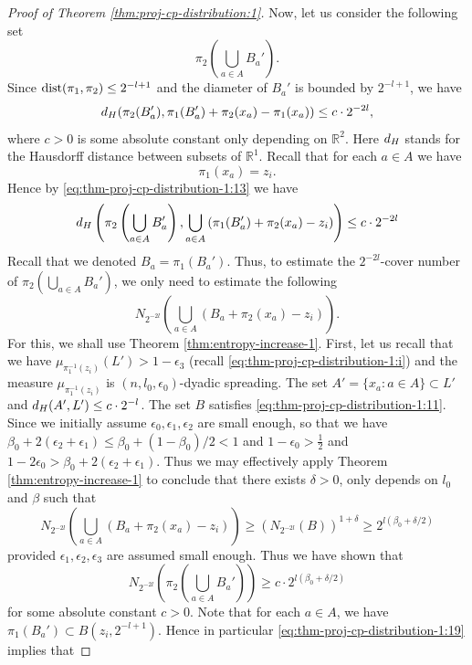 \documentclass[10pt,a4paper]{amsart}
\DeclareMathOperator{\dist}{{\rm dist}}
\def\R{\mathbb R}
\begin{document}
\begin{proof}[Proof of Theorem \ref{thm:proj-cp-distribution:1}]
Now, let us consider the following set 
\[
\pi_2\left( \bigcup_{a\in A}B_a' \right).
\]
Since $\dist(\pi_1,\pi_2)\le 2^{-l+1}$ and the diameter of $B_a'$ is bounded by $2^{-l+1}$,  we have
\begin{equation}\label{eq:thm-proj-cp-distribution-1:13}
d_{\rm H}(\pi_2(B_a'),  \pi_1(B_a')+ \pi_2(x_a) -\pi_1(x_a)) \le  c\cdot 2^{-2l},
\end{equation}
where $c>0$ is some absolute constant only depending on $\R^2$.  Here $d_{\rm H}$ stands for the Hausdorff distance between subsets of $\R^1$. 
Recall that for each $a\in A$ we have
\begin{equation}\label{eq:thm-proj-cp-distribution-1:14}
\pi_1(x_a)=z_i.
\end{equation}
Hence by \eqref{eq:thm-proj-cp-distribution-1:13} we have
{\color{black}
\[
d_{\rm H}\left(\pi_2\left(\bigcup_{a\in A}B_a'\right),  \bigcup_{a\in A}\left(\pi_1(B_a')+ \pi_2(x_a) -z_i\right)\right)\le  c\cdot 2^{-2l}
\]}
Recall that we denoted $B_a=\pi_1(B_a')$.  Thus, to estimate the $2^{-2l}$-cover number of $\pi_2\left( \bigcup_{a\in A}B_a' \right)$, we only need to estimate the following
\[
N_{2^{-2l}}\left( \bigcup_{a\in A}(B_a+ \pi_2(x_a) -z_i) \right).
\]
For this, we shall use Theorem \ref{thm:entropy-increase-1}.   
First,  let us recall that we have $\mu_{\pi_1^{-1}(z_i)} (L')>1-\epsilon_3$ (recall  \eqref{eq:thm-proj-cp-distribution-1:i}) and the 
measure $\mu_{\pi_1^{-1}(z_i)}$ is $(n,l_0,\epsilon_0)$-dyadic spreading.
The set $A'=\{x_a:a\in A\}\subset L'$ and $d_{\rm H}(A',L')\le c\cdot 2^{-l}$.
The set $B$ satisfies \eqref{eq:thm-proj-cp-distribution-1:11}.  Since we initially assume $\epsilon_0,\epsilon_1,\epsilon_2$ are small enough, so that we have $\beta_0+2(\epsilon_2+ \epsilon_1) \le \beta_0+(1-\beta_0)/2<1$ and  $1-\epsilon_0>\frac{1}{2}$ and $1-2\epsilon_0>\beta_0+2(\epsilon_2+ \epsilon_1) $.  Thus we may effectively apply Theorem \ref{thm:entropy-increase-1} to conclude that  there exists $\delta>0$, only depends on $l_0$ and $\beta$ such that 
\[
N_{2^{-2l}}\left( \bigcup_{a\in A}(B_a+ \pi_2(x_a) -z_i) \right)\ge \left(N_{2^{-2l}}(B)\right)^{1+\delta}\ge 2^{l(\beta_0+\delta/2)}
\]
provided $\epsilon_1, \epsilon_2,  \epsilon_3$ are assumed small enough.
Thus we have shown that 
\begin{equation}\label{eq:thm-proj-cp-distribution-1:19}
N_{2^{-2l}}\left( \pi_2\left( \bigcup_{a\in A}B_a' \right) \right) \ge c\cdot 2^{l(\beta_0+\delta/2)}
\end{equation}
for some absolute constant $c>0$.  Note that for each $a\in A$,  we have $\pi_1(B_a')\subset B(z_i,2^{-l+1})$.  Hence in particular \eqref{eq:thm-proj-cp-distribution-1:19} implies that 

\end{proof}
\end{document}
